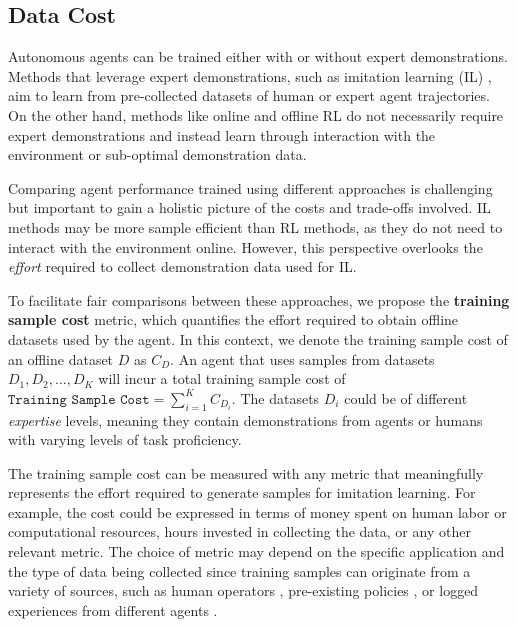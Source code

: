 \subsection{Data Cost}
\label{sec:training_sample_cost}
Autonomous agents can be trained either with or without expert demonstrations. Methods that leverage expert demonstrations, such as imitation learning (IL) \citep{gail, bc_zero, robotics_transformer, bansal2018chauffeurnet,kelly2019hg,Sermanet2018TimeContrastive}, aim to learn from pre-collected datasets of human or expert agent trajectories. On the other hand, methods like online \citep{mnih2015human} and offline RL \citep{levine2020offline,uchendu2023jump,nair2020awac,ball2023efficient} do not necessarily require expert demonstrations and instead learn through interaction with the environment or sub-optimal demonstration data.

Comparing agent performance trained using different approaches is challenging but important to gain a holistic picture of the costs and trade-offs involved.
IL methods may be more sample efficient than RL methods, as they do not need to interact with the environment online. However, this perspective overlooks the \textit{effort} required to collect demonstration data used for IL.

To facilitate fair comparisons between these approaches, we propose the \textbf{training sample cost} metric, which quantifies the effort required to obtain offline datasets used by the agent.
In this context, we denote the training sample cost of an offline dataset $D$ as $C_D$.
An agent that uses samples from datasets $D_1, D_2, \dots, D_K$ will incur a total training sample cost of $\texttt{Training Sample Cost} = \sum_{i=1}^K C_{D_i}$.
The datasets $D_i$ could be of different \textit{expertise} levels, meaning they contain demonstrations from agents or humans with varying levels of task proficiency.

The training sample cost can be measured with any metric that meaningfully represents the effort required to generate samples for imitation learning. For example, the cost could be expressed in terms of money spent on human labor or computational resources, hours invested in collecting the data, or any other relevant metric.
The choice of metric may depend on the specific application and the type of data being collected since training samples can originate from a variety of sources, such as human operators \citep{mandlekar2020learning}, pre-existing policies \citep{hester2018deep}, or logged experiences from different agents \citep{fujimoto2019off,kostrikov2021offline}.

